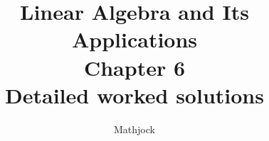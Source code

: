 
\title{\textbf{Linear Algebra and Its Applications}\\[0.3em]Chapter 6\\[0.3em]\large Detailed worked solutions}
\author{Mathjock}
\date{}

\maketitle
\bookinfo
\tableofcontents
\clearpage
\renewcommand{\thesection}{6.\arabic{section}}
\renewcommand{\theHsection}{6.\arabic{section}}
\setcounter{section}{0}

\clearpage
\renewcommand{\thesection}{6.\arabic{section}}
\renewcommand{\theHsection}{6.\arabic{section}}
\setcounter{section}{1}

\clearpage
\renewcommand{\thesection}{6.\arabic{section}}
\renewcommand{\theHsection}{6.\arabic{section}}
\setcounter{section}{2}

\clearpage
\renewcommand{\thesection}{6.\arabic{section}}
\renewcommand{\theHsection}{6.\arabic{section}}
\setcounter{section}{3}

\clearpage
\renewcommand{\thesection}{6.\arabic{section}}
\renewcommand{\theHsection}{6.\arabic{section}}
\setcounter{section}{4}

\clearpage
\renewcommand{\thesection}{6.\arabic{section}}
\renewcommand{\theHsection}{6.\arabic{section}}
\setcounter{section}{5}

\clearpage
\renewcommand{\thesection}{6.\arabic{section}}
\renewcommand{\theHsection}{6.\arabic{section}}
\setcounter{section}{6}

\clearpage
\renewcommand{\thesection}{6.\arabic{section}}
\renewcommand{\theHsection}{6.\arabic{section}}
\setcounter{section}{7}

\clearpage
\renewcommand{\thesection}{6.S}
\renewcommand{\theHsection}{6.S}
\setcounter{section}{0}


